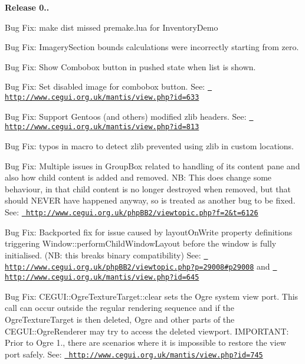 {\bfseries{Release 0..}}
\begin{DoxyItemize}
\item Bug Fix\+: make dist missed premake.\+lua for Inventory\+Demo
\item Bug Fix\+: Imagery\+Section bounds calculations were incorrectly starting from zero.
\item Bug Fix\+: Show Combobox button in pushed state when list is shown.
\item Bug Fix\+: Set disabled image for combobox button. See\+: \href{http://www.cegui.org.uk/mantis/view.php?id=633}{\texttt{ http\+://www.\+cegui.\+org.\+uk/mantis/view.\+php?id=633}}
\item Bug Fix\+: Support Gentoo\textquotesingle{}s (and others\textquotesingle{}) modified zlib headers. See\+: \href{http://www.cegui.org.uk/mantis/view.php?id=813}{\texttt{ http\+://www.\+cegui.\+org.\+uk/mantis/view.\+php?id=813}}
\item Bug Fix\+: typos in macro to detect zlib prevented using zlib in custom locations.
\item Bug Fix\+: Multiple issues in Group\+Box related to handling of its content pane and also how child content is added and removed. NB\+: This does change some behaviour, in that child content is no longer destroyed when removed, but that should N\+E\+V\+ER have happened anyway, so is treated as another bug to be fixed. See\+: \href{http://www.cegui.org.uk/phpBB2/viewtopic.php?f=2&t=6126}{\texttt{ http\+://www.\+cegui.\+org.\+uk/php\+B\+B2/viewtopic.\+php?f=2\&t=6126}}
\item Bug Fix\+: Backported fix for issue caused by layout\+On\+Write property definitions triggering Window\+::perform\+Child\+Window\+Layout before the window is fully initialised. (NB\+: this breaks binary compatibility) See\+: \href{http://www.cegui.org.uk/phpBB2/viewtopic.php?p=29008\#p29008}{\texttt{ http\+://www.\+cegui.\+org.\+uk/php\+B\+B2/viewtopic.\+php?p=29008\#p29008}} and \href{http://www.cegui.org.uk/mantis/view.php?id=645}{\texttt{ http\+://www.\+cegui.\+org.\+uk/mantis/view.\+php?id=645}}
\item Bug Fix\+: C\+E\+G\+U\+I\+::\+Ogre\+Texture\+Target\+::clear sets the Ogre system view port. This call can occur outside the regular rendering sequence and if the Ogre\+Texture\+Target is then deleted, Ogre and other parts of the C\+E\+G\+U\+I\+::\+Ogre\+Renderer may try to access the deleted viewport. I\+M\+P\+O\+R\+T\+A\+NT\+: Prior to Ogre 1., there are scenarios where it is impossible to restore the view port safely. See\+: \href{http://www.cegui.org.uk/mantis/view.php?id=745}{\texttt{ http\+://www.\+cegui.\+org.\+uk/mantis/view.\+php?id=745}}

\end{DoxyItemize}
